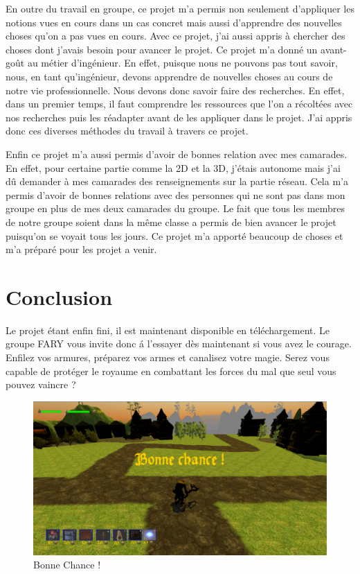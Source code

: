 \documentclass[a4paper, 12pt]{article}
\begin{document}
\par En outre du travail en groupe, ce projet m’a permis non seulement d’appliquer les notions vues en cours dans un cas concret mais aussi d’apprendre des nouvelles choses qu’on a pas vues en cours. Avec ce projet, j’ai aussi appris à chercher des choses dont j’avais besoin pour avancer le projet. Ce projet m’a donné un avant-go\^ut au métier d’ingénieur. En effet, puisque nous ne pouvons pas tout savoir, nous, en tant qu’ingénieur, devons apprendre de nouvelles choses au cours de notre vie professionnelle. Nous devons donc savoir faire des recherches. En effet, dans un premier temps, il faut comprendre les ressources que l'on a récoltées avec nos recherches puis les réadapter avant de les appliquer dans le projet. J’ai appris donc ces diverses méthodes du travail à travers ce projet.
\medbreak
\par Enfin ce projet m’a aussi permis d’avoir de bonnes relation avec mes camarades. En effet, pour certaine partie comme la 2D et la 3D, j’étais autonome mais j’ai dû demander à mes camarades des renseignements sur la partie réseau.  Cela m’a permis d’avoir de bonnes relations avec des personnes qui ne sont pas dans mon groupe en plus de mes deux camarades du groupe. Le fait que tous les membres de notre groupe soient dans la même classe a permis de bien avancer le projet puisqu’on se voyait tous les jours. Ce projet m'a apport\'e beaucoup de choses et m'a pr\'epar\'e pour les projet a venir. 


\section{Conclusion}

Le projet \'etant enfin fini, il est maintenant disponible en t\'el\'echargement. Le groupe FARY vous invite donc \'a l'essayer d\`es maintenant si vous avez le courage. Enfilez vos armures, pr\'eparez vos armes et canalisez votre magie. Serez vous capable de prot\'eger le royaume en combattant les forces du mal que seul vous pouvez vaincre ?

\begin{figure}[!ht]
\centerline{\includegraphics[scale=0.3]{BonneChance.png}}
\caption*{Bonne Chance !}
\end{figure}
\end{document}
